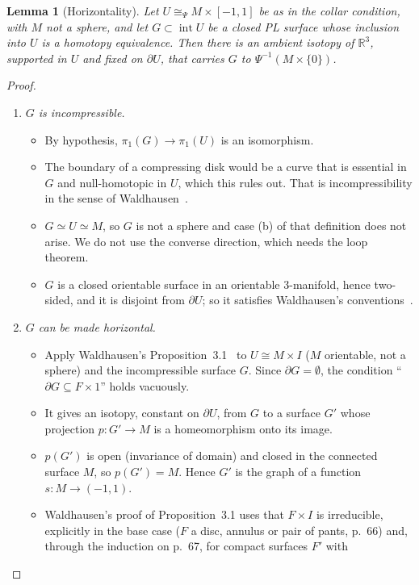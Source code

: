 \documentclass[preprint,12pt]{elsarticle}
\newtheorem{lemma}[theorem]{Lemma}
\theoremstyle{definition}
\theoremstyle{remark}
\newcommand{\R}{\mathbb{R}}
\newcommand{\inter}{\operatorname{int}}
\begin{document}
\begin{lemma}[Horizontality]\label{lem:horizontal}
Let $U\cong_{\Psi}M\times[-1,1]$ be as in the collar condition, with $M$ not a sphere, and let $G\subset\inter U$
be a closed PL surface whose inclusion into $U$ is a homotopy equivalence. Then there is an ambient isotopy of
$\R^3$, supported in $U$ and fixed on $\partial U$, that carries $G$ to $\Psi^{-1}(M\times\{0\})$.
\end{lemma}
\begin{proof}
\begin{enumerate}
\item[(a)] \emph{$G$ is incompressible.}
  \begin{itemize}
  \item By hypothesis, $\pi_1(G)\to\pi_1(U)$ is an isomorphism.
  \item The boundary of a compressing disk would be a curve that is essential in $G$ and null-homotopic in $U$,
  which this rules out. That is incompressibility in the sense of Waldhausen~\cite[p.~58]{Waldhausen68}.
  \item $G\simeq U\simeq M$, so $G$ is not a sphere and case (b) of that definition does not arise. We do not use the
  converse direction, which needs the loop theorem.
  \item $G$ is a closed orientable surface in an orientable 3-manifold, hence two-sided, and it is disjoint from
  $\partial U$; so it satisfies Waldhausen's conventions~\cite[\S0]{Waldhausen68}.
  \end{itemize}
\item[(b)] \emph{$G$ can be made horizontal.}
  \begin{itemize}
  \item Apply Waldhausen's Proposition~3.1~\cite[pp.~65--68]{Waldhausen68} to $U\cong M\times I$ ($M$ orientable,
  not a sphere) and the incompressible surface $G$. Since $\partial G=\emptyset$, the condition
  ``$\partial G\subseteq F\times1$'' holds vacuously.
  \item It gives an isotopy, constant on $\partial U$, from $G$ to a surface $G'$ whose projection
  $p\colon G'\to M$ is a homeomorphism onto its image.
  \item $p(G')$ is open (invariance of domain) and closed in the connected surface $M$, so $p(G')=M$. Hence $G'$ is
  the graph of a function $s\colon M\to(-1,1)$.
  \item Waldhausen's proof of Proposition~3.1 uses that $F\times I$ is irreducible, explicitly in the base case
  ($F$ a disc, annulus or pair of pants, p.~66) and, through the induction on p.~67, for compact surfaces $F'$ with

\end{itemize}
\end{enumerate}
\end{proof}
\end{document}
